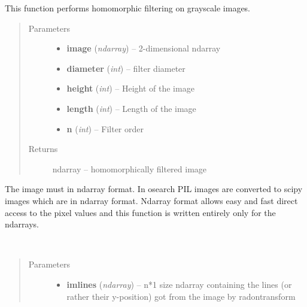 \documentclass[letterpaper,10pt,english]{sphinxmanual}
\begin{document}
\begin{fulllineitems}
\begin{fulllineitems}
\end{fulllineitems}


\begin{fulllineitems}
\label{code:osearch.OratUtils.hfilter}
This function performs homomorphic filtering on grayscale images.
\begin{quote}\begin{description}
\item[{Parameters}] \leavevmode\begin{itemize}
\item {} 
\textbf{image} (\emph{ndarray}) -- 2-dimensional ndarray

\item {} 
\textbf{diameter} (\emph{int}) -- filter diameter

\item {} 
\textbf{height} (\emph{int}) -- Height of the image

\item {} 
\textbf{length} (\emph{int}) -- Length of the image

\item {} 
\textbf{n} (\emph{int}) -- Filter order

\end{itemize}

\item[{Returns}] \leavevmode
ndarray -- homomorphically filtered image

\end{description}\end{quote}

The image must in ndarray format. In osearch PIL images are converted to scipy images which 
are in ndarray format. Ndarray format allows easy and fast direct access to the pixel values 
and this function is written entirely only for the ndarrays.

\end{fulllineitems}


\begin{fulllineitems}
\label{code:osearch.OratUtils.padlines}~\begin{quote}\begin{description}
\item[{Parameters}] \leavevmode\begin{itemize}
\item {} 
\textbf{imlines} (\emph{ndarray}) -- n*1 size ndarray containing the lines (or rather their y-position) got from the image by radontransform


\end{itemize}
\end{description}
\end{quote}
\end{fulllineitems}
\end{fulllineitems}
\end{document}
